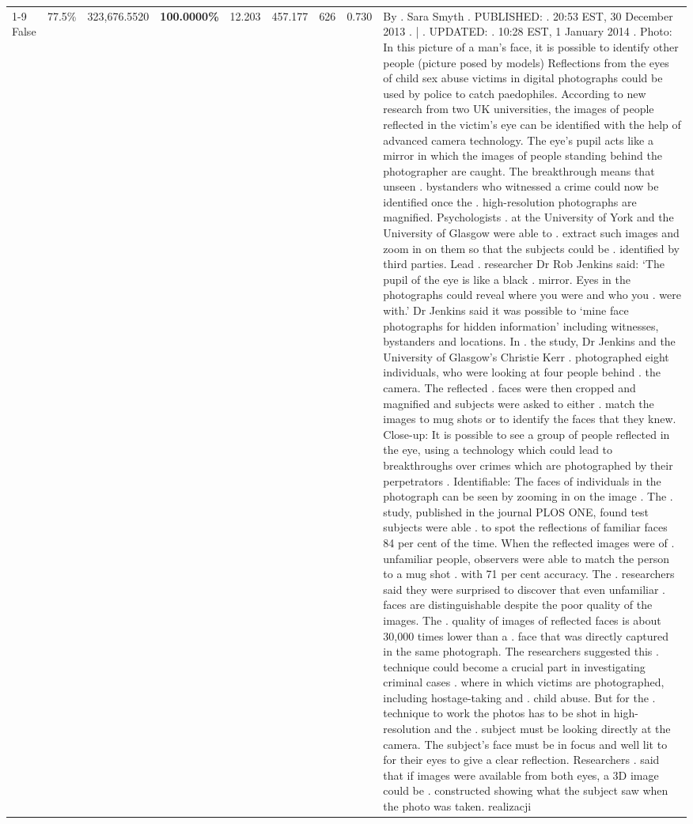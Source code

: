 \begin{table}[H]
\begin{tabular}{lllrlllll}
\cline{1-9}
False & 77.5\% & 323,676.5520 & \bfseries \color{red} 100.0000\% & 12.203 & 457.177 & 626 & 0.730 & By . Sara Smyth . PUBLISHED: . 20:53 EST, 30 December 2013 . | . UPDATED: . 10:28 EST, 1 January 2014 . Photo: In this picture of a man's face, it is possible to identify other people (picture posed by models) Reflections from the eyes of child sex abuse victims in digital photographs could be used by police to catch paedophiles. According to new research from two UK universities, the images of people reflected in the victim's eye can be identified with the help of advanced camera technology. The eye's pupil acts like a mirror in which the images of people standing behind the photographer are caught. The breakthrough means that unseen . bystanders who witnessed a crime could now be identified once the . high-resolution photographs are magnified. Psychologists . at the University of York and the University of Glasgow were able to . extract such images and zoom in on them so that the subjects could be . identified by third parties. Lead . researcher Dr Rob Jenkins said: ‘The pupil of the eye is like a black . mirror. Eyes in the photographs could reveal where you were and who you . were with.' Dr Jenkins said it was possible to ‘mine face photographs for hidden information' including witnesses, bystanders and locations. In . the study, Dr Jenkins and the University of Glasgow's Christie Kerr . photographed eight individuals, who were looking at four people behind . the camera. The reflected . faces were then cropped and magnified and subjects were asked to either . match the images to mug shots or to identify the faces that they knew. Close-up: It is possible to see a group of people reflected in the eye, using a technology which could lead to breakthroughs over crimes which are photographed by their perpetrators . Identifiable: The faces of individuals in the photograph can be seen by zooming in on the image . The . study, published in the journal PLOS ONE, found test subjects were able . to spot the reflections of familiar faces 84 per cent of the time. When the reflected images were of . unfamiliar people, observers were able to match the person to a mug shot . with 71 per cent accuracy. The . researchers said they were surprised to discover that even unfamiliar . faces are distinguishable despite the poor quality of the images. The . quality of images of reflected faces is about 30,000 times lower than a . face that was directly captured in the same photograph. The researchers suggested this . technique could become a crucial part in investigating criminal cases . where in which victims are photographed, including hostage-taking and . child abuse. But for the . technique to work the photos has to be shot in high-resolution and the . subject must be looking directly at the camera. The subject's face must be in focus and well lit to for their eyes to give a clear reflection. Researchers . said that if images were available from both eyes, a 3D image could be . constructed showing what the subject saw when the photo was taken. realizacji \\

\end{tabular}
\end{table}

